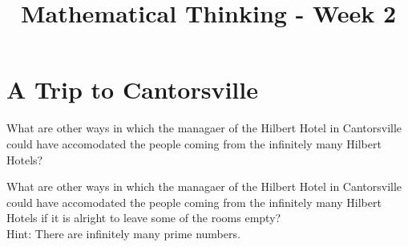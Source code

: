 \documentclass[12pt]{exam}
\title{Mathematical Thinking - Week 2}
\begin{document}
\maketitle
\tableofcontents
\section{A Trip to Cantorsville}
\begin{questions}
    \question What are other ways in which the managaer of the Hilbert Hotel in Cantorsville could have accomodated the people coming from the infinitely many Hilbert Hotels?

    \question What are other ways in which the managaer of the Hilbert Hotel in Cantorsville could have accomodated the people coming from the infinitely many Hilbert Hotels if it is alright to leave some of the rooms empty?\\
    Hint: There are infinitely many prime numbers.
\end{questions}
\end{document}
